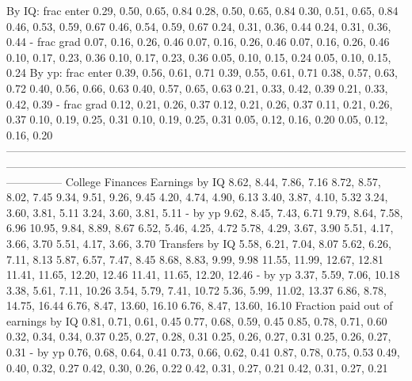                      By IQ: frac enter       0.29, 0.50, 0.65, 0.84       0.28, 0.50, 0.65, 0.84   0.30, 0.51, 0.65, 0.84    0.46, 0.53, 0.59, 0.67      0.46, 0.54, 0.59, 0.67      0.24, 0.31, 0.36, 0.44      0.24, 0.31, 0.36, 0.44
                           - frac grad       0.07, 0.16, 0.26, 0.46       0.07, 0.16, 0.26, 0.46   0.07, 0.16, 0.26, 0.46    0.10, 0.17, 0.23, 0.36      0.10, 0.17, 0.23, 0.36      0.05, 0.10, 0.15, 0.24      0.05, 0.10, 0.15, 0.24
                     By yp: frac enter       0.39, 0.56, 0.61, 0.71       0.39, 0.55, 0.61, 0.71   0.38, 0.57, 0.63, 0.72    0.40, 0.56, 0.66, 0.63      0.40, 0.57, 0.65, 0.63      0.21, 0.33, 0.42, 0.39      0.21, 0.33, 0.42, 0.39
                           - frac grad       0.12, 0.21, 0.26, 0.37       0.12, 0.21, 0.26, 0.37   0.11, 0.21, 0.26, 0.37    0.10, 0.19, 0.25, 0.31      0.10, 0.19, 0.25, 0.31      0.05, 0.12, 0.16, 0.20      0.05, 0.12, 0.16, 0.20
---------------------------------------------------------------------------------------------------------------------------------------------------------------------------------------------------------------------------------------
                      College Finances                                                                                                                                                                                                 
                        Earnings by IQ       8.62, 8.44, 7.86, 7.16       8.72, 8.57, 8.02, 7.45   9.34, 9.51, 9.26, 9.45    4.20, 4.74, 4.90, 6.13      3.40, 3.87, 4.10, 5.32      3.24, 3.60, 3.81, 5.11      3.24, 3.60, 3.81, 5.11
                               - by yp       9.62, 8.45, 7.43, 6.71       9.79, 8.64, 7.58, 6.96  10.95, 9.84, 8.89, 8.67    6.52, 5.46, 4.25, 4.72      5.78, 4.29, 3.67, 3.90      5.51, 4.17, 3.66, 3.70      5.51, 4.17, 3.66, 3.70
                       Transfers by IQ       5.58, 6.21, 7.04, 8.07       5.62, 6.26, 7.11, 8.13   5.87, 6.57, 7.47, 8.45    8.68, 8.83, 9.99, 9.98  11.55, 11.99, 12.67, 12.81  11.41, 11.65, 12.20, 12.46  11.41, 11.65, 12.20, 12.46
                               - by yp      3.37, 5.59, 7.06, 10.18      3.38, 5.61, 7.11, 10.26  3.54, 5.79, 7.41, 10.72  5.36, 5.99, 11.02, 13.37    6.86, 8.78, 14.75, 16.44    6.76, 8.47, 13.60, 16.10    6.76, 8.47, 13.60, 16.10
   Fraction paid out of earnings by IQ       0.81, 0.71, 0.61, 0.45       0.77, 0.68, 0.59, 0.45   0.85, 0.78, 0.71, 0.60    0.32, 0.34, 0.34, 0.37      0.25, 0.27, 0.28, 0.31      0.25, 0.26, 0.27, 0.31      0.25, 0.26, 0.27, 0.31
                               - by yp       0.76, 0.68, 0.64, 0.41       0.73, 0.66, 0.62, 0.41   0.87, 0.78, 0.75, 0.53    0.49, 0.40, 0.32, 0.27      0.42, 0.30, 0.26, 0.22      0.42, 0.31, 0.27, 0.21      0.42, 0.31, 0.27, 0.21
